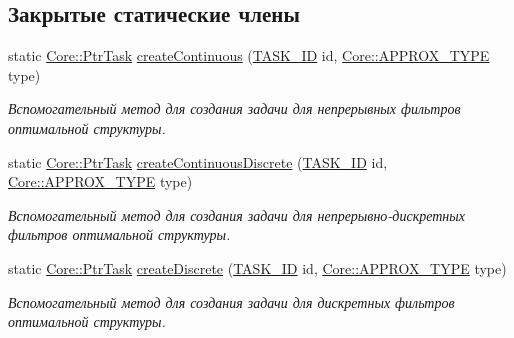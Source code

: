 \subsection*{Закрытые статические члены}
\begin{DoxyCompactItemize}
\item 
static \hyperlink{namespace_core_abfda8f69fcacfcea2696549b548ed737}{Core\+::\+Ptr\+Task} \hyperlink{class_tasks_1_1_task_factory_aa8c79efba82e51c6cf6e75b8cdb94066}{create\+Continuous} (\hyperlink{namespace_tasks_acf6b541f8ce51b63eb9fcb8748317707}{T\+A\+S\+K\+\_\+\+ID} id, \hyperlink{namespace_core_acd67f53ff1d9b21fabb1da4474a8f7d9}{Core\+::\+A\+P\+P\+R\+O\+X\+\_\+\+T\+Y\+PE} type)\hypertarget{class_tasks_1_1_task_factory_aa8c79efba82e51c6cf6e75b8cdb94066}{}\label{class_tasks_1_1_task_factory_aa8c79efba82e51c6cf6e75b8cdb94066}

\begin{DoxyCompactList}\small\item\em Вспомогательный метод для создания задачи для непрерывных фильтров оптимальной структуры. \end{DoxyCompactList}\item 
static \hyperlink{namespace_core_abfda8f69fcacfcea2696549b548ed737}{Core\+::\+Ptr\+Task} \hyperlink{class_tasks_1_1_task_factory_a35acfe104a777f69cbcd17a1b4be2fb4}{create\+Continuous\+Discrete} (\hyperlink{namespace_tasks_acf6b541f8ce51b63eb9fcb8748317707}{T\+A\+S\+K\+\_\+\+ID} id, \hyperlink{namespace_core_acd67f53ff1d9b21fabb1da4474a8f7d9}{Core\+::\+A\+P\+P\+R\+O\+X\+\_\+\+T\+Y\+PE} type)\hypertarget{class_tasks_1_1_task_factory_a35acfe104a777f69cbcd17a1b4be2fb4}{}\label{class_tasks_1_1_task_factory_a35acfe104a777f69cbcd17a1b4be2fb4}

\begin{DoxyCompactList}\small\item\em Вспомогательный метод для создания задачи для непрерывно-\/дискретных фильтров оптимальной структуры. \end{DoxyCompactList}\item 
static \hyperlink{namespace_core_abfda8f69fcacfcea2696549b548ed737}{Core\+::\+Ptr\+Task} \hyperlink{class_tasks_1_1_task_factory_a54d4fc408cce16975ea718928af92988}{create\+Discrete} (\hyperlink{namespace_tasks_acf6b541f8ce51b63eb9fcb8748317707}{T\+A\+S\+K\+\_\+\+ID} id, \hyperlink{namespace_core_acd67f53ff1d9b21fabb1da4474a8f7d9}{Core\+::\+A\+P\+P\+R\+O\+X\+\_\+\+T\+Y\+PE} type)\hypertarget{class_tasks_1_1_task_factory_a54d4fc408cce16975ea718928af92988}{}\label{class_tasks_1_1_task_factory_a54d4fc408cce16975ea718928af92988}

\begin{DoxyCompactList}\small\item\em Вспомогательный метод для создания задачи для дискретных фильтров оптимальной структуры. \end{DoxyCompactList}\end{DoxyCompactItemize}



